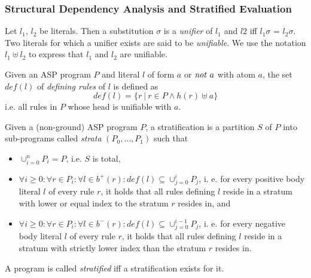 \subsubsection{Structural Dependency Analysis and Stratified Evaluation}


\begin{definition}[Unification]
\label{def:prelims-asp-semantics-unification}
Let $l_1$, $l_2$ be literals. Then a substitution $\sigma$ is a \emph{unifier} of $l_1$ and $l2$ iff $l_{1}\sigma$ = $l_{2}\sigma$. Two literals for which a unifier exists are said to be \emph{unifiable}. We use the notation $l_1 \uplus l_2$ to express that $l_1$ and $l_2$ are unifiable.
\end{definition}

\begin{definition}
\label{def:prelims-asp-semantics}
Given an ASP program $P$ and literal $l$ of form $a$ or $\mathit{not}\ a$ with atom $a$, the set $\mathit{def}(l)$ of \emph{defining rules} of $l$ is defined as
\[
	\mathit{def}(l) = \{ r\ |\ r \in P \land h(r) \uplus a \}
\]
i.e. all rules in $P$ whose head is unifiable with $a$.
\end{definition}

\begin{definition}
\label{def:prelims-asp-semantics-stratification}
Given a (non-ground) ASP program $P$, a stratification is a partition $S$ of $P$ into sub-programs called \emph{strata} $(P_0,\ldots,P_1)$ such that
\begin{itemize}
	\item $\cup^{n}_{i = 0} P_i = P$, i.e. $S$ is total,
	\item $\forall i \geq 0: \forall r \in P_i: \forall l \in b^{+}(r): \mathit{def}(l) \subseteq \cup^{i}_{j = 0} P_j$, i. e. for every positive body literal $l$ of every rule $r$, it holds that all rules defining $l$ reside in a stratum with lower or equal index to the stratum $r$ resides in, and
	\item $\forall i \geq 0: \forall r \in P_i: \forall l \in b^{-}(r): \mathit{def}(l) \subseteq \cup^{i - 1}_{j = 0} P_j$, i. e. for every negative body literal $l$ of every rule $r$, it holds that all rules defining $l$ reside in a stratum with strictly lower index than the stratum $r$ resides in.
\end{itemize}
A program is called \emph{stratified} iff a stratification exists for it.
\end{definition}

